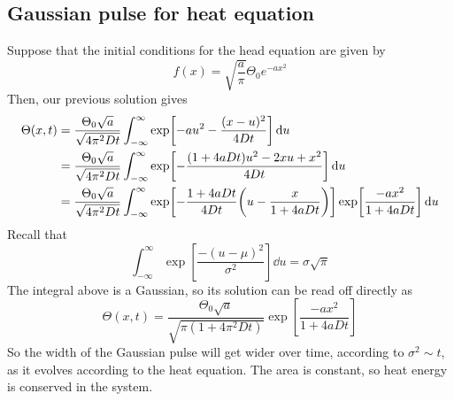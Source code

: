 \documentclass[a4paper]{article}
\begin{document}
\subsection{Gaussian pulse for heat equation}
Suppose that the initial conditions for the head equation are given by
\[
	f(x) = \sqrt{\frac{a}{\pi}} \Theta_0 e^{-ax^2}
\]
Then, our previous solution gives
\begin{align*}
	\Theta(x,t) & = \frac{\Theta_0 \sqrt{a}}{\sqrt{4 \pi^2 D t}} \int_{-\infty}^\infty \exp[-au^2 - \frac{(x-u)^2}{4 D t}] \dd{u}                                                      \\
	            & = \frac{\Theta_0 \sqrt{a}}{\sqrt{4 \pi^2 D t}} \int_{-\infty}^\infty \exp[-\frac{(1 + 4 a D t)u^2 - 2xu + x^2}{4 D t}] \dd{u}                                        \\
	            & = \frac{\Theta_0 \sqrt{a}}{\sqrt{4 \pi^2 D t}} \int_{-\infty}^\infty \exp[-\frac{1 + 4 a D t}{4 D t} \qty(u - \frac{x}{1+4aDt}) ] \exp[ \frac{-ax^2}{1+4aDt}] \dd{u}
\end{align*}
Recall that
\[
	\int_{-\infty}^\infty \exp[\frac{-(u - \mu)^2}{\sigma^2}] \dd{u} = \sigma \sqrt{\pi}
\]
The integral above is a Gaussian, so its solution can be read off directly as
\[
	\Theta(x,t) = \frac{\Theta_0 \sqrt{a}}{\sqrt{\pi (1 + 4 \pi^2 D t)}} \exp[\frac{-ax^2}{1+4aDt}]
\]
So the width of the Gaussian pulse will get wider over time, according to \( \sigma^2 \sim t \), as it evolves according to the heat equation.
The area is constant, so heat energy is conserved in the system.
\end{document}
